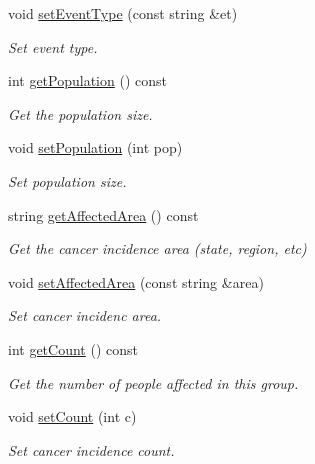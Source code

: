 \begin{DoxyCompactItemize}
void \hyperlink{classbridges_1_1dataset_1_1_cancer_incidence_aab3f76d957b69ef5fcefb491388e1d29}{set\+Event\+Type} (const string \&et)
\begin{DoxyCompactList}\small\item\em Set event type. \end{DoxyCompactList}\item 
int \hyperlink{classbridges_1_1dataset_1_1_cancer_incidence_a7f34f811c1e0a40e52e91d55653fe656}{get\+Population} () const
\begin{DoxyCompactList}\small\item\em Get the population size. \end{DoxyCompactList}\item 
void \hyperlink{classbridges_1_1dataset_1_1_cancer_incidence_a468eae18b9af44a25fe3f586283875e4}{set\+Population} (int pop)
\begin{DoxyCompactList}\small\item\em Set population size. \end{DoxyCompactList}\item 
string \hyperlink{classbridges_1_1dataset_1_1_cancer_incidence_abb62f6d102dc571ab46b633de8365b86}{get\+Affected\+Area} () const
\begin{DoxyCompactList}\small\item\em Get the cancer incidence area (state, region, etc) \end{DoxyCompactList}\item 
void \hyperlink{classbridges_1_1dataset_1_1_cancer_incidence_a0eaa01e6c760702ca0e69dca16919c9b}{set\+Affected\+Area} (const string \&area)
\begin{DoxyCompactList}\small\item\em Set cancer incidenc area. \end{DoxyCompactList}\item 
int \hyperlink{classbridges_1_1dataset_1_1_cancer_incidence_a3841428ae70cac0663153d22a46080df}{get\+Count} () const
\begin{DoxyCompactList}\small\item\em Get the number of people affected in this group. \end{DoxyCompactList}\item 
void \hyperlink{classbridges_1_1dataset_1_1_cancer_incidence_ac7083b46243f611392d33fc1c2dbce0d}{set\+Count} (int c)
\begin{DoxyCompactList}\small\item\em Set cancer incidence count. \end{DoxyCompactList}\item 

\end{DoxyCompactItemize}
